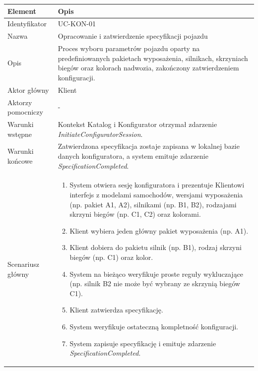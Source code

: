 \begin{longtable}{|p{4cm}|p{11cm}|}
\hline
\textbf{Element} & \textbf{Opis} \\
\hline

Identyfikator & UC-KON-01 \\
\hline

Nazwa & Opracowanie i zatwierdzenie specyfikacji pojazdu \\
\hline

Opis & 
Proces wyboru parametrów pojazdu oparty na predefiniowanych pakietach wyposażenia, silnikach, skrzyniach biegów oraz kolorach nadwozia, zakończony zatwierdzeniem konfiguracji. \\
\hline

Aktor główny & Klient \\
\hline

Aktorzy pomocniczy & -  \\
\hline

Warunki wstępne & 
Kontekst Katalog i Konfigurator otrzymał zdarzenie \textit{InitiateConfiguratorSession}. \\
\hline

Warunki końcowe & 
Zatwierdzona specyfikacja zostaje zapisana w lokalnej bazie danych konfiguratora, a system emituje zdarzenie \textit{SpecificationCompleted}. \\
\hline

Scenariusz główny & 
\begin{enumerate}
    \item System otwiera sesję konfiguratora i prezentuje Klientowi interfejs z modelami samochodów, wersjami wyposażenia (np. pakiet A1, A2), silnikami (np. B1, B2), rodzajami skrzyni biegów (np. C1, C2) oraz kolorami.
    \item Klient wybiera jeden główny pakiet wyposażenia (np. A1).
    \item Klient dobiera do pakietu silnik (np. B1), rodzaj skrzyni biegów (np. C1) oraz kolor.
    \item System na bieżąco weryfikuje proste reguły wykluczające (np. silnik B2 nie może być wybrany ze skrzynią biegów C1).
    \item Klient zatwierdza specyfikację.
    \item System weryfikuje ostateczną kompletność konfiguracji.
    \item System zapisuje specyfikację i emituje zdarzenie \textit{SpecificationCompleted}.
\end{enumerate} \\
\hline


\end{longtable}
